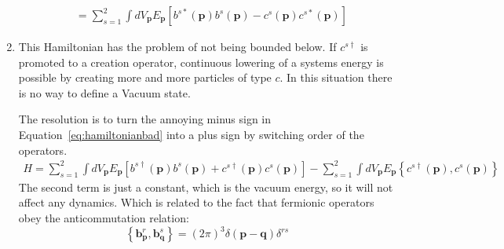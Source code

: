 \documentclass[12pt,a4]{article}
\begin{document}
\begin{enumerate}
\begin{align}
        &=  \sum_{s = 1}^2 \int d V_\mathbf{p}   E_\mathbf{p} \left[ b ^{s*} (\mathbf{p}) b ^s (\mathbf{p}) - c ^{s} (\mathbf{p}) c ^{s*} (\mathbf{p}) \right]\label{eq:hamiltonianbad} 
    \end{align}
  \item
    This Hamiltonian has the problem of not being bounded below.
    If $c^{s\dagger}$ is promoted to a creation operator, continuous lowering of a systems energy is possible by creating more and more particles of type $c$.
    In this situation there is no way to define a Vacuum state.

    The resolution is to turn the annoying minus sign in Equation~\ref{eq:hamiltonianbad} into a plus sign by switching order of the operators.
    \begin{align*}
      H = \sum_{s = 1}^2 \int d V_\mathbf{p}   E_\mathbf{p} \left[ b ^{s\dagger} (\mathbf{p}) b ^s (\mathbf{p}) + c ^{s\dagger} (\mathbf{p}) c ^{s} (\mathbf{p}) \right] - \sum_{s = 1}^2 \int d V_\mathbf{p} E_\mathbf{p}\left\{c ^{s\dagger} (\mathbf{p}) ,c ^{s} (\mathbf{p})\right\}
    \end{align*}
    The second  term is just a constant, which is the vacuum energy, so it will not affect any dynamics.
    Which is related to the fact that fermionic operators obey the anticommutation relation:
    \begin{equation*}
      \left\{\mathbf{b}^r_\mathbf{p},\mathbf{b}^s_\mathbf{q}\right\} = (2\pi)^3\delta(\mathbf{p} - \mathbf{q})\delta^{rs}
    \end{equation*}

\end{enumerate}
\end{document}
